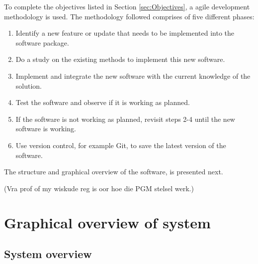 To complete the objectives listed in Section \ref{sec:Objectives}, a agile development methodology is used. The methodology followed comprises of five different phases:
\begin{enumerate}
\item Identify a new feature or update that needs to be implemented into the software package.
\item Do a study on the existing methods to implement this new software.
\item Implement and integrate the new software with the current knowledge of the solution.
\item Test the software and observe if it is working as planned.
\item If the software is not working as planned, revisit steps 2-4 until the new software is working.
\item Use version control, for example Git, to save the latest version of the software.
\end{enumerate}

The structure and graphical overview of the software, is presented next.

(Vra prof of my wiskude reg is oor hoe die PGM stelsel werk.)

\section{Graphical overview of system}
\subsection{System overview}

